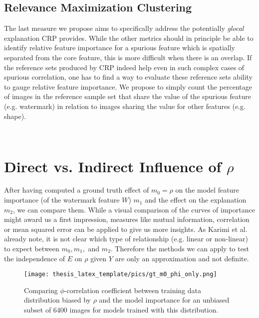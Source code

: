 \subsection{Relevance Maximization Clustering}
The last measure we propose aims to specifically address the potentially \textit{glocal} explanation CRP provides. While the other metrics should in principle be able to identify relative feature importance for a spurious feature which is spatially separated from the core feature, this is more difficult when there is an overlap. If the reference sets produced by CRP indeed help even in such complex cases of spurious correlation, one has to find a way to evaluate these reference sets ability to gauge relative feature importance.
We propose to simply count the percentage of images in the reference sample set that share the value of the spurious feature (e.g. watermark) in relation to images sharing the value for other features (e.g. shape). 

\begin{align}\displaystyle
& 
\end{align}

\section{Direct vs. Indirect Influence of $\rho$}
After having computed a ground truth effect of $m_0 = \rho$ on the model feature importance (of the watermark feature $W$) $m_1$ and the effect on the explanation $m_2$, we can compare them.
While a visual comparison of the curves of importance might award us a first impression, measures like mutual information, correlation  or mean squared error can be applied to give us more insights. As Karimi et al. \cite{Karimi2023} already note,
it is not clear which type of relationship (e.g. linear or non-linear) to expect between $m_0, m_1, $ and $m_2$. Therefore the methods we can apply to test the independence of $E$ on $\rho$ given $Y$ are only an approximation and not definite.

\begin{figure}[t!]
    \centering
    \texttt{[image: thesis\_latex\_template/pics/gt\_m0\_phi\_only.png]}
    \caption[$m_0$ vs. $m_1$]{Comparing $\phi$-correlation coefficient between training data distribution biased by $\rho$ and the model importance for an unbiased subset of 6400 images for models trained with this distribution. }
    \label{fig:m0_m1}
\end{figure}

